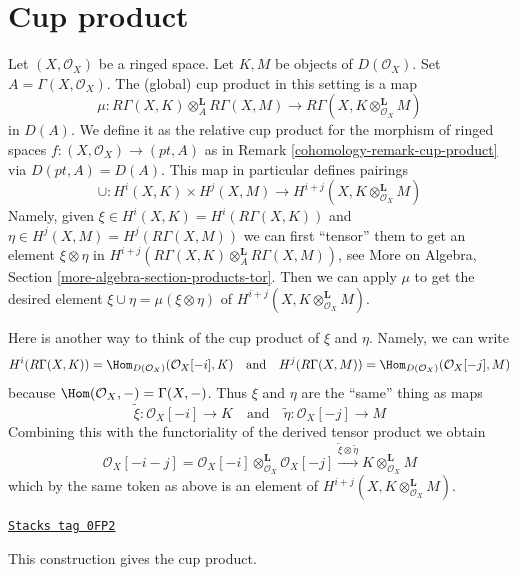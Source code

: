 \section{Cup product}
\label{cohomology-section-cup-product}
Let $(X, \mathcal{O}_X)$ be a ringed space. Let $K, M$ be objects
of $D(\mathcal{O}_X)$. Set $A = \Gamma(X, \mathcal{O}_X)$.
The (global) cup product in this setting is a map
$$
\mu :
R\Gamma(X, K) \otimes_A^\mathbf{L} R\Gamma(X, M)
\longrightarrow
R\Gamma(X, K \otimes_{\mathcal{O}_X}^\mathbf{L} M)
$$
in $D(A)$. We define it as the relative cup product for the
morphism of ringed spaces $f : (X, \mathcal{O}_X) \to (pt, A)$
as in Remark \ref{cohomology-remark-cup-product} via $D(pt, A) = D(A)$.
This map in particular defines pairings
$$
\cup :
H^i(X, K) \times H^j(X, M)
\longrightarrow
H^{i + j}(X, K \otimes_{\mathcal{O}_X}^\mathbf{L} M)
$$
Namely, given $\xi \in H^i(X, K) = H^i(R\Gamma(X, K))$ and
$\eta \in H^j(X, M) = H^j(R\Gamma(X, M))$ we can
first ``tensor'' them to get an element $\xi \otimes \eta$ in
$H^{i + j}(R\Gamma(X, K) \otimes_A^\mathbf{L} R\Gamma(X, M))$, see
More on Algebra, Section \ref{more-algebra-section-products-tor}.
Then we can apply $\mu$ to get the desired element
$\xi \cup \eta = \mu(\xi \otimes \eta)$
of $H^{i + j}(X, K \otimes_{\mathcal{O}_X}^\mathbf{L} M)$.

\medskip\noindent
Here is another way to think of the cup product of $\xi$ and $\eta$.
Namely, we can write
$$
H^i(R\Gamma(X, K)) = \Hom_{D(\mathcal{O}_X)}(\mathcal{O}_X[-i], K)
\quad\text{and}\quad
H^j(R\Gamma(X, M)) = \Hom_{D(\mathcal{O}_X)}(\mathcal{O}_X[-j], M)
$$
because $\Hom(\mathcal{O}_X, -) = \Gamma(X, -)$.
Thus $\xi$ and $\eta$ are the ``same'' thing as maps
$$
\tilde \xi : \mathcal{O}_X[-i] \to K
\quad\text{and}\quad
\tilde \eta : \mathcal{O}_X[-j] \to M
$$
Combining this with the functoriality of the derived tensor product
we obtain
$$
\mathcal{O}_X[-i - j] =
\mathcal{O}_X[-i] \otimes_{\mathcal{O}_X}^\mathbf{L} \mathcal{O}_X[-j]
\xrightarrow{\tilde \xi \otimes \tilde \eta}
K \otimes_{\mathcal{O}_X}^\mathbf{L} M
$$
which by the same token as above is an element of
$H^{i + j}(X, K \otimes_{\mathcal{O}_X}^\mathbf{L} M)$.

\begin{lemma}
\label{cohomology-lemma-second-cup-equals-first}
\href{https://stacks.math.columbia.edu/tag/0FP2}{\texttt{Stacks tag 0FP2}}

This construction gives the cup product.
\end{lemma}

